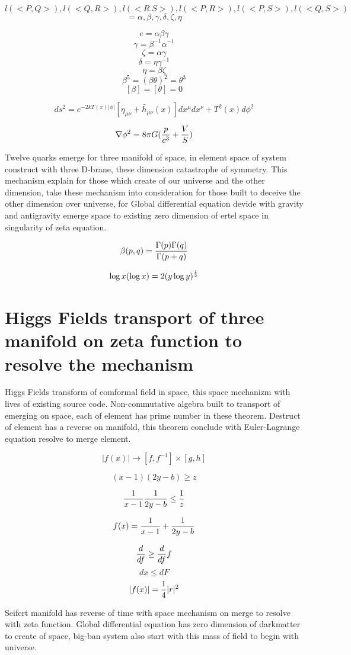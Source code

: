 \documentclass{jsarticle}
\begin{document}
$$ l(<P,Q>),l(<Q,R>),l(<R.S>),l(<P,R>),l(<P,S>),l(<Q,S>) $$
$$ = \alpha, \beta, \gamma,\delta,\zeta,\eta $$

$$ e = \alpha \beta \gamma $$
$$ \gamma = \beta^{-1} \alpha^{-1} $$
$$ \zeta = \alpha \gamma $$
$$ \delta = \eta \gamma^{-1} $$
$$ \eta = \beta \zeta $$
$$ \beta^5 = (\beta \theta)^2 = \theta^3 $$
$$ [\beta] = [\theta] =0 $$

  $$ ds^2 = e^{-2kT(x)|\phi|}[\eta_{\mu\nu} + \bar{h}_{\mu\nu}(x)]dx^{\mu}dx^{\nu} + T^2(x) d\phi^2 $$

  $$ \nabla \phi^2 = 8 \pi G({p \over c^3} + {V \over S}) $$


 Twelve quarks emerge for three manifold of space, in element space of system construct with three D-brane, 
these dimension catastrophe of symmetry. This mechanism explain for those which create of our universe and the
other dimension, take these mechanism into consideration for those built to deceive the other dimension
over universe, for Global differential equation devide with gravity and antigravity emerge space to existing
zero dimension of ertel space in singularity of zeta equation.

$$ \beta (p,q) = {\Gamma(p) \Gamma(q) \over \Gamma(p + q)} $$

	$$ \log x(\log x) = 2 (y \log y)^{1 \over 2} $$
\section{Higgs Fields transport of three manifold on zeta function to resolve the mechanism}

  Higgs Fields transform of comformal field in space, this space mechanizm with lives of existing source code.
Non-commutative algebra built to transport of emerging on space, each of element has prime number in these theorem.
Destruct of element has a reverse on manifold, this theorem conclude with Euler-Lagrange equation resolve
to merge element.

$$ |f(x)| \to [f, f^{-1}] \times [g, h] $$ 

$$ (x - 1)(2y - b) \ge z $$

$$ {1 \over x - 1}{1 \over 2y - b} \le {1 \over z} $$

$$ f(x) = {1 \over x - 1} + {1 \over 2y - b} $$

$$ {d \over df} \ge {d \over df}f $$
$$ dx \le dF $$
$$ |f(x)| = {1 \over 4}|r|^2$$

  Seifert manifold has reverse of time with space mechanism on merge to resolve with zeta function. Global
differential equation has zero dimension of darkmatter to create of space, big-ban system also start with
this mass of field to begin with universe.
\end{document}
